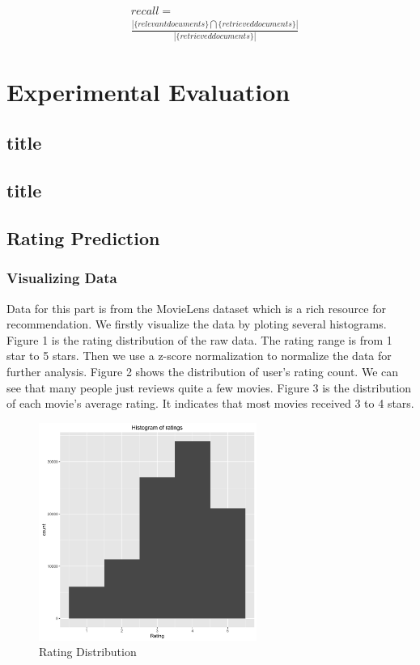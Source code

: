 \documentclass[conference]{IEEEtran}
\begin{document}
\begin{equation}
\begin{split}
& recall = \\
&\frac{\left|\{relevant documents\}\bigcap \{retrieved documents\}\right|}{\left|\{retrieved documents\}\right|}
\end{split}
\end{equation}


\section{Experimental Evaluation }
\subsection{title}
\subsection{title}

\subsection{Rating Prediction}
\subsubsection{Visualizing Data}
Data for this part is from the MovieLens dataset which is a rich resource for recommendation. We firstly visualize the data by ploting several histograms. Figure 1 is the rating distribution of the raw data. The rating range is from 1 star to 5 stars. Then we use a z-score normalization to normalize the data for further analysis. Figure 2 shows the distribution of user's rating count. We can see that many people just reviews quite a few movies. Figure 3 is the distribution of each movie's average rating. It indicates that most movies received 3 to 4 stars.
\begin{figure}
	\centering
	\includegraphics[width=2.8in]{rating.png}
	\caption{Rating Distribution}
	\label{fig:side:a}
\end{figure}
\end{document}
